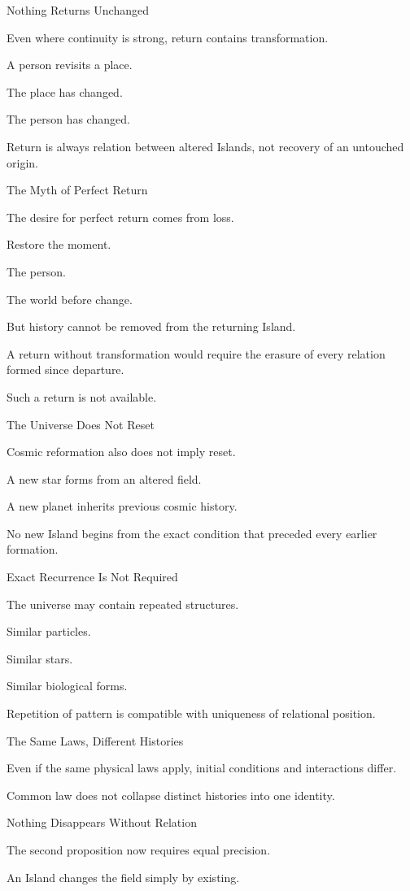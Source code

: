 Nothing Returns Unchanged

Even where continuity is strong, return contains transformation.

A person revisits a place.

The place has changed.

The person has changed.

Return is always relation between altered Islands, not recovery of an untouched origin.

The Myth of Perfect Return

The desire for perfect return comes from loss.

Restore the moment.

The person.

The world before change.

But history cannot be removed from the returning Island.

A return without transformation would require the erasure of every relation formed since departure.

Such a return is not available.

The Universe Does Not Reset

Cosmic reformation also does not imply reset.

A new star forms from an altered field.

A new planet inherits previous cosmic history.

No new Island begins from the exact condition that preceded every earlier formation.

Exact Recurrence Is Not Required

The universe may contain repeated structures.

Similar particles.

Similar stars.

Similar biological forms.

Repetition of pattern is compatible with uniqueness of relational position.

The Same Laws, Different Histories

Even if the same physical laws apply, initial conditions and interactions differ.

Common law does not collapse distinct histories into one identity.

Nothing Disappears Without Relation

The second proposition now requires equal precision.

An Island changes the field simply by existing.

